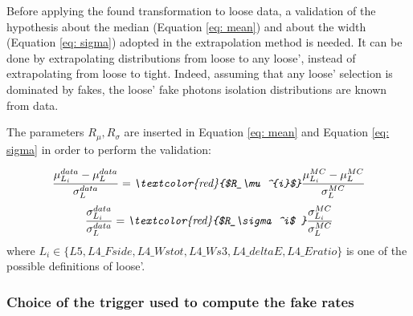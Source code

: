 Before applying the found transformation to loose data, a validation of the hypothesis about the median (Equation \ref{eq: mean}) and about the width (Equation \ref{eq: sigma}) adopted in the extrapolation method is needed. It can be done by extrapolating distributions from loose to any loose', instead of extrapolating from loose to tight. Indeed, assuming that any loose' selection is dominated by fakes, the loose' fake photons isolation distributions are known from data. 


The parameters $R_\mu, R_\sigma$  are inserted in Equation \ref{eq: mean} and Equation \ref{eq: sigma} in order to perform the validation:  

\begin{equation}
    \frac{\mu_{L_{i}}^{data} -\mu_L^{data}}{\sigma_L^{data}} =   \textit{\textcolor{red}{$R_\mu^{i}$}} \frac{\mu_{L_{i}}^{MC} - \mu_L^{MC}}{\sigma_L^{MC}} 
\end{equation}
\begin{equation}
     \frac{\sigma_{L_{i}}^{data}}{\sigma_L^{data}} = \textit{\textcolor{red}{$R_\sigma^i$ }}\frac{\sigma_{L_{i}}^{MC}}{\sigma_L^{MC}}
\end{equation}
where $L_{i} \in \{L5, L4\_\textit{Fside}, L4\_\textit{Wstot}, L4\_\textit{Ws3}, L4\_\textit{deltaE}, L4\_\textit{Eratio} \}$ is one of the possible definitions of loose'.

\subsubsection{Choice of the trigger used to compute the fake rates}

